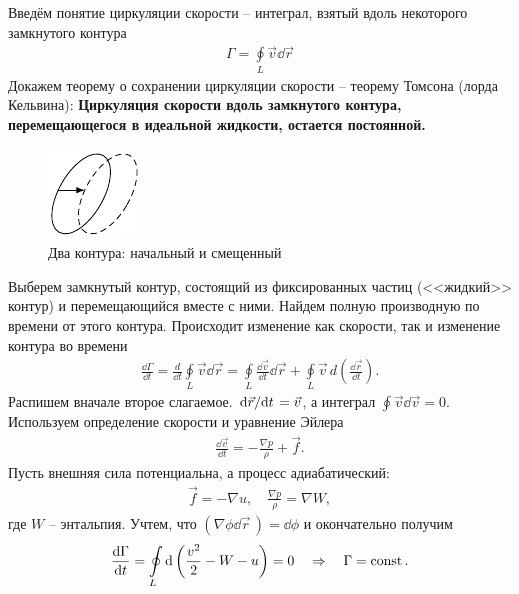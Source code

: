 Введём понятие циркуляции скорости -- интеграл, взятый вдоль некоторого замкнутого контура
\begin{align*}
\Gamma = \oint \limits_ { L } \vec{v} \dd{\vec{r}}
\end{align*}
Докажем теорему о сохранении циркуляции скорости -- теорему Томсона (лорда Кельвина):
\textbf{Циркуляция скорости вдоль замкнутого контура, перемещающегося в идеальной жидкости, остается постоянной.}

\begin{figure}[h!]
	\centering
	\includegraphics[scale=1.5]{img/2contur}
	\caption{Два контура: начальный и смещенный}
	\label{fig:figure13}
\end{figure}

Выберем замкнутый контур, состоящий из фиксированных частиц (<<жидкий>> контур) и перемещающийся вместе с ними.  Найдем полную производную по времени от этого контура. Происходит изменение как скорости, так и изменение контура во времени
\begin{align*}
\frac{\dd \Gamma}{\dd t}=\frac{d}{\dd t} \oint\limits_{L} \vec{v} \dd \vec{r}=\oint\limits_{L} \frac{\dd \vec{v}}{\dd t} \dd \vec{r}+\oint\limits_L \vec{v}\, d\left(\frac{\dd \vec{r}}{\dd t}\right).
\end{align*}
Распишем вначале второе слагаемое. $\dv*{\vec{r}}{t}=\vec{v}$, а интеграл $\oint \vec{v}\dd{\vec{v}}=0$.
%
Используем определение скорости и уравнение Эйлера
\begin{align*}
\frac { \dd \vec{v}  } { \dd t } = - \frac { \nabla p } { \rho } + \vec { f }.
\end{align*}
%
Пусть внешняя сила потенциальна, а процесс адиабатический:
\begin{align*}
{ \vec { f } = - \nabla u }, \quad
{ \frac { \nabla p } { \rho } = \nabla W },
\end{align*}
где $W$ -- энтальпия.  Учтем, что $ ( \nabla \phi \dd{\vec{r}}\, ) = \dd \phi $ и окончательно получим
\begin{align*}
\frac { \dd \Gamma } { \dd t } = \oint\limits _ { L } \dd \left( \frac { v ^ { 2 } } { 2 } - W - u \right) = 0 \quad \Rightarrow \quad  \Gamma = \mathrm{const}\,.
\end{align*}

